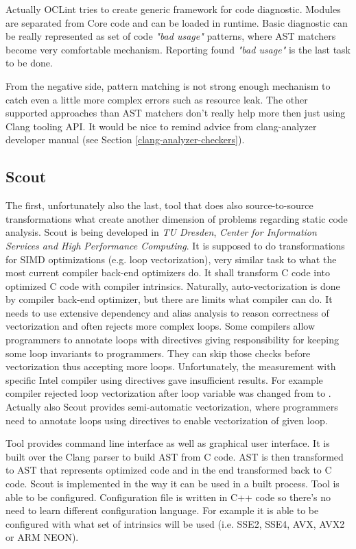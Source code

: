 Actually OCLint tries to create generic framework for code diagnostic. Modules are separated from Core code and can be loaded in runtime. Basic diagnostic can be really represented as set of code \textit{"bad usage"} patterns, where AST matchers become very comfortable mechanism. Reporting found \textit{"bad usage"} is the last task to be done.

From the negative side, pattern matching is not strong enough mechanism to catch even a little more complex errors such as resource leak. The other supported approaches than AST matchers don't really help more then just using Clang tooling API. It would be nice to remind advice from clang-analyzer developer manual (see Section \ref{clang-analyzer-checkers}).

\subsection{Scout}
The first, unfortunately also the last, tool that does also source-to-source transformations what create another dimension of problems regarding static code analysis. Scout is being developed in \emph{TU Dresden}, \emph{Center for Information Services and High Performance Computing}. It is supposed to do transformations for SIMD optimizations (e.g. loop vectorization), very similar task to what the most current compiler back-end optimizers do. It shall transform C code into optimized C code with compiler intrinsics. Naturally, auto-vectorization is done by compiler back-end optimizer, but there are limits what compiler can do. It needs to use extensive dependency and alias analysis to reason correctness of vectorization and often rejects more complex loops. Some compilers allow programmers to annotate loops with  directives giving responsibility for keeping some loop invariants to programmers. They can skip those checks before vectorization thus accepting more loops. Unfortunately, the measurement with specific Intel compiler using  directives gave insufficient results. For example compiler rejected loop vectorization after loop variable was changed from  to . Actually also Scout provides semi-automatic vectorization, where programmers need to annotate loops using  directives to enable vectorization of given loop. 

Tool provides command line interface as well as graphical user interface. It is built over the Clang parser to build AST from C code. AST is then transformed to AST that represents optimized code and in the end transformed back to C code. Scout is implemented in the way it can be used in a built process. Tool is able to be configured. Configuration file is written in C++ code so there's no need to learn different configuration language. For example it is able to be configured with what set of intrinsics will be used (i.e. SSE2, SSE4, AVX, AVX2 or ARM NEON).

